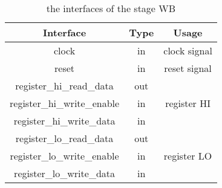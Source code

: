\begin{table}[!h]
\centering
\begin{tabular}{|c|c|c|}
\hline
Interface & Type & Usage \\ \hline
clock & in & clock signal \\ \hline
reset & in & reset signal \\ \hline
register\_hi\_read\_data & out & \multirow{3}{*}{register HI} \\ \cline{1-2}
register\_hi\_write\_enable & in &  \\ \cline{1-2}
register\_hi\_write\_data & in &  \\ \hline
register\_lo\_read\_data & out & \multirow{3}{*}{register LO} \\ \cline{1-2}
register\_lo\_write\_enable & in &  \\ \cline{1-2}
register\_lo\_write\_data & in &  \\ \hline
\end{tabular}
\caption{the interfaces of the stage WB}
\end{table}
